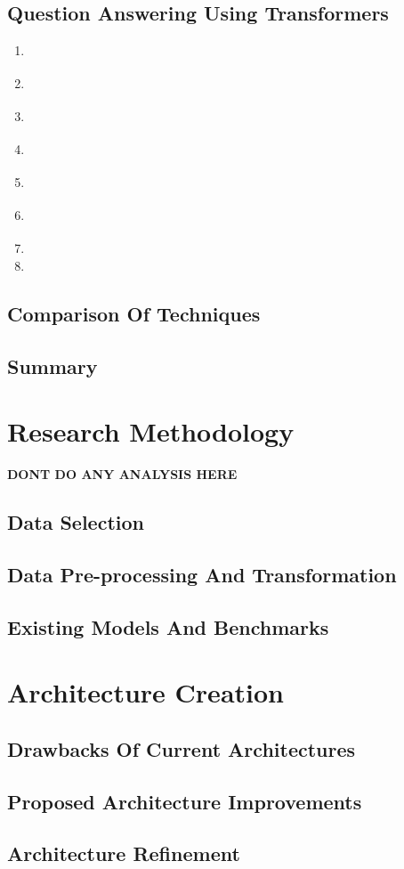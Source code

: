 \documentclass[12pt]{report}
\begin{document}
        \section{Question Answering Using Transformers}\label{23}
            \begin{enumerate}
                \item \cite{atayl}
                \item \cite{bert}
                \item \cite{albert}
                \item \cite{roberta}
                \item \cite{distil}
                \item \cite{squad}
                \item
                \item
            \end{enumerate}
        \section{Comparison Of Techniques}\label{24}
        \section{Summary}\label{25}
        \citep{RAM}

    \chapter{\centering Research Methodology}\label{c3}
    \textbf{DONT DO ANY ANALYSIS HERE}
    \section{Data Selection}\label{c31}
    \section{Data Pre-processing And Transformation}\label{c32}
    \section{Existing Models And Benchmarks}\label{c33}
    \chapter{\centering Architecture Creation}\label{c4}
    \section{Drawbacks Of Current Architectures}\label{c41}
    \section{Proposed Architecture Improvements}\label{c42}
    \section{Architecture Refinement}\label{c43}
    \begin{appendices}
    \end{appendices}
    \printglossary[type=\acronymtype,title=List Of Acronyms]
    
\end{document}
